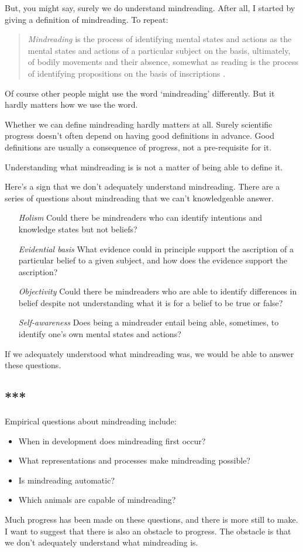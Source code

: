 \documentclass[12pt,\papersize]{extarticle}
\begin{document}
But, you might say, surely we do understand mindreading.
After all, I started by giving a definition of mindreading.  To repeat:
%
\begin{quote}
\textit{Mindreading} is 
	the process of 
	identifying mental states and actions 
	as the mental states and actions of a particular subject 
	on the basis, ultimately, of bodily movements and their absence,
somewhat as reading is the process of identifying propositions on the basis of inscriptions \citep[p.\ 4]{Apperly:2010kx}.
\end{quote}
%
Of course other people might use the word `mindreading' differently.
But it hardly matters how we use the word.

Whether we can define mindreading hardly matters at all.
Surely scientific progress doesn't often depend on having good definitions in advance.
Good definitions are usually a consequence of progress, not a pre-requisite for it.

Understanding what mindreading is is not a matter of being able to define it.

Here's a sign that we don't adequately understand mindreading.
There are a series of questions about mindreading that we can't knowledgeable answer.
\begin{itemize}
%
\item [\emph{Holism}] Could there be mindreaders who can identify intentions and knowledge states but not beliefs?
%
\item [\emph{Evidential basis}] What evidence could in principle support the ascription of a particular belief to a given subject, and how does the evidence support the ascription?
%
\item [\emph{Objectivity}] Could there be mindreaders who are able to identify differences in belief despite not understanding what it is for a belief to be true or false? 
%
\item [\emph{Self-awareness}] Does being a mindreader entail being able, sometimes, to identify one's own mental states and actions? 
%
\end{itemize}
%
If we adequately understood what mindreading was, we would be able to answer these questions.




\subsection{***}

Empirical questions about mindreading include:
\begin{itemize}
\item When in development does mindreading first occur?
\item What representations and processes make mindreading possible?
\item Is mindreading automatic?
\item Which animals are capable of mindreading?
\end{itemize}
%
Much progress has been made on these questions, and there is more still to make. 
I want to suggest that there is also an obstacle to progress.
The obstacle is that we don't adequately understand what mindreading is. 
\end{document}
